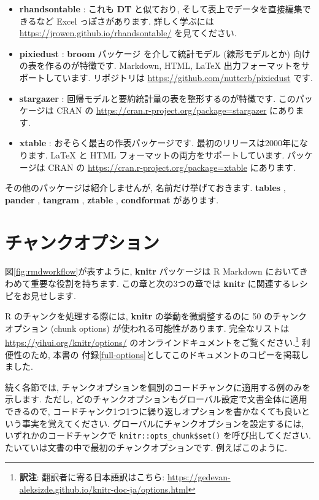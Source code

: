 \documentclass[
  11pt,
]{bxjsreport}
\begin{document}
\begin{itemize}
\item
  \textbf{rhandsontable} \autocite{R-rhandsontable}: これも \textbf{DT} と似ており, そして表上でデータを直接編集できるなど Excel っぽさがあります. 詳しく学ぶには \url{https://jrowen.github.io/rhandsontable/} を見てください.
\item
  \textbf{pixiedust} \autocite{R-pixiedust}: \textbf{broom} パッケージ \autocite{R-broom} を介して統計モデル (線形モデルとか) 向けの表を作るのが特徴です. Markdown, HTML, LaTeX 出力フォーマットをサポートしています. リポジトリは \url{https://github.com/nutterb/pixiedust} です.
\item
  \textbf{stargazer} \autocite{R-stargazer}: 回帰モデルと要約統計量の表を整形するのが特徴です. このパッケージは CRAN の \url{https://cran.r-project.org/package=stargazer} にあります.
\item
  \textbf{xtable} \autocite{R-xtable}: おそらく最古の作表パッケージです. 最初のリリースは2000年になります. LaTeX と HTML フォーマットの両方をサポートしています. パッケージは CRAN の \url{https://cran.r-project.org/package=xtable} にあります.
\end{itemize}

その他のパッケージは紹介しませんが, 名前だけ挙げておきます. \textbf{tables} \autocite{R-tables}, \textbf{pander} \autocite{R-pander}, \textbf{tangram} \autocite{R-tangram}, \textbf{ztable} \autocite{R-ztable}, \textbf{condformat} \autocite{R-condformat} があります.

\hypertarget{chunk-options}{%
\chapter{チャンクオプション}\label{chunk-options}}

図\ref{fig:rmdworkflow}が表すように, \textbf{knitr} パッケージは R Markdown においてきわめて重要な役割を持ちます. この章と次の3つの章では \textbf{knitr} に関連するレシピをお見せします.

R のチャンクを処理する際には, \textbf{knitr} の挙動を微調整するのに 50 のチャンクオプション (chunk options) が使われる可能性があります. 完全なリストは \url{https://yihui.org/knitr/options/} のオンラインドキュメントをご覧ください.\footnote{\textbf{訳注}: 翻訳者に寄る日本語訳はこちら: \url{https://gedevan-aleksizde.github.io/knitr-doc-ja/options.html}} 利便性のため, 本書の 付録\ref{full-options}としてこのドキュメントのコピーを掲載しました.

続く各節では, チャンクオプションを個別のコードチャンクに適用する例のみを示します. ただし, どのチャンクオプションもグローバル設定で文書全体に適用できるので, コードチャンク1つ1つに繰り返しオプションを書かなくても良いという事実を覚えてください. グローバルにチャンクオプションを設定するには, いずれかのコードチャンクで \texttt{knitr::opts\_chunk\$set()} を呼び出してください. たいていは文書の中で最初のチャンクオプションです. 例えばこのように.
\end{document}
